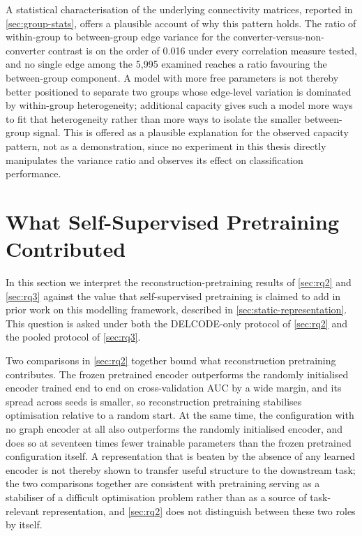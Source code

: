 A statistical characterisation of the underlying connectivity matrices, reported in
\autoref{sec:group-stats}, offers a plausible account of why this pattern holds. The ratio
of within-group to between-group edge variance for the converter-versus-non-converter
contrast is on the order of 0.016 under every correlation measure tested, and no single
edge among the 5{,}995 examined reaches a ratio favouring the between-group component. A
model with more free parameters is not thereby better positioned to separate two groups
whose edge-level variation is dominated by within-group heterogeneity; additional capacity
gives such a model more ways to fit that heterogeneity rather than more ways to isolate the
smaller between-group signal. This is offered as a plausible explanation for the observed
capacity pattern, not as a demonstration, since no experiment in this thesis directly
manipulates the variance ratio and observes its effect on classification performance.

\section{What Self-Supervised Pretraining Contributed}\label{sec:ssl-contribution}

In this section we interpret the reconstruction-pretraining results of \autoref{sec:rq2}
and \autoref{sec:rq3} against the value that self-supervised pretraining is claimed to add
in prior work on this modelling framework, described in \autoref{sec:static-representation}.
This question is asked under both the \ac{DELCODE}-only protocol of \autoref{sec:rq2} and
the pooled protocol of \autoref{sec:rq3}.

Two comparisons in \autoref{sec:rq2} together bound what reconstruction pretraining
contributes. The frozen pretrained encoder outperforms the randomly initialised encoder
trained end to end on cross-validation \ac{AUC} by a wide margin, and its spread across
seeds is smaller, so reconstruction pretraining stabilises optimisation relative to a
random start. At the same time, the configuration with no graph encoder at all also
outperforms the randomly initialised encoder, and does so at seventeen times fewer
trainable parameters than the frozen pretrained configuration itself. A representation
that is beaten by the absence of any learned encoder is not thereby shown to transfer
useful structure to the downstream task; the two comparisons together are consistent with
pretraining serving as a stabiliser of a difficult optimisation problem rather than as a
source of task-relevant representation, and \autoref{sec:rq2} does not distinguish between
these two roles by itself.


